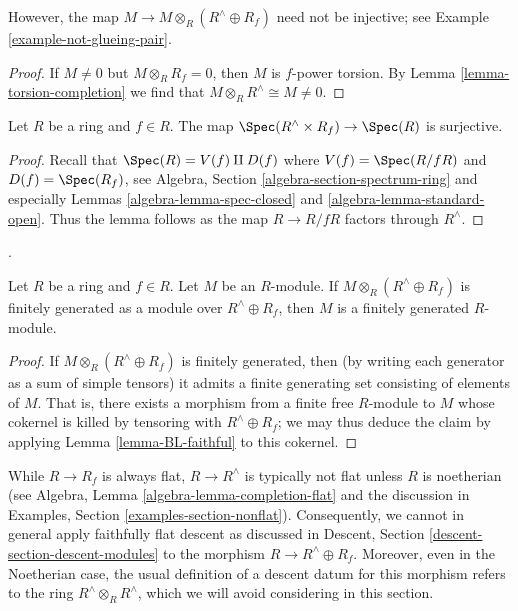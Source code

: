 \noindent
However, the map $M \to M \otimes_R (R^\wedge \oplus R_f)$ need not be 
injective; see Example \ref{example-not-glueing-pair}.

\begin{proof}
If $M \neq 0$ but $M \otimes_R R_f = 0$, then $M$ is $f$-power torsion.
By Lemma \ref{lemma-torsion-completion} we find that
$M \otimes_R R^\wedge \cong M \neq 0$.
\end{proof}

\begin{lemma}
\label{lemma-cover-spec}
Let $R$ be a ring and $f \in R$.
The map $\Spec(R^\wedge \times R_f) \to \Spec(R)$ is surjective.
\end{lemma}

\begin{proof}
Recall that $\Spec(R) = V(f) \amalg D(f)$ where $V(f) = \Spec(R/fR)$
and $D(f) = \Spec(R_f)$, see
Algebra, Section \ref{algebra-section-spectrum-ring}
and especially Lemmas \ref{algebra-lemma-spec-closed} and
\ref{algebra-lemma-standard-open}.
Thus the lemma follows as the map $R \to R/fR$ factors through $R^\wedge$.
\end{proof}

\begin{lemma}
\label{lemma-faithful-descent}
\begin{reference}
\cite[Lemme~2(a)]{Beauville-Laszlo}.
\end{reference}
Let $R$ be a ring and $f \in R$.
Let $M$ be an $R$-module. If $M \otimes_R (R^\wedge \oplus R_f)$
is finitely generated as a module over $R^\wedge \oplus R_f$, then
$M$ is a finitely generated $R$-module.
\end{lemma}

\begin{proof}
If $M \otimes_R (R^\wedge \oplus R_f)$ is finitely generated, then (by 
writing each generator as a sum of simple tensors) it admits a finite 
generating set consisting of elements of $M$.
That is, there exists a morphism from a finite free $R$-module to $M$ whose 
cokernel is killed by tensoring with $R^\wedge \oplus R_f$; 
we may thus deduce the claim by applying
Lemma \ref{lemma-BL-faithful} to this cokernel.
\end{proof}

\begin{remark}
\label{remark-not-descent}
While $R \to R_f$ is always flat, $R \to R^\wedge$ is typically not flat 
unless $R$ is noetherian (see
Algebra, Lemma \ref{algebra-lemma-completion-flat}
and the discussion in
Examples, Section \ref{examples-section-nonflat}).
Consequently, we cannot in general apply faithfully flat descent
as discussed in Descent, Section
\ref{descent-section-descent-modules}
to the morphism $R \to R^\wedge \oplus R_f$.
Moreover, even in the Noetherian case, the usual 
definition of a descent datum for this morphism
refers to the ring $R^\wedge \otimes_R R^\wedge$, which we will
avoid considering in this section.
\end{remark}

